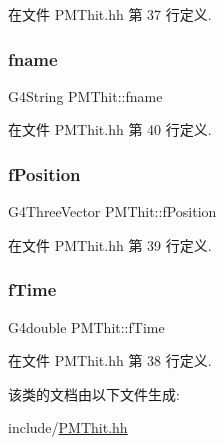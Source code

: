 在文件 P\+M\+Thit.\+hh 第 37 行定义.

\mbox{\label{classPMThit_a54a384bce361d05e46661879765acf6c}} 
\subsubsection{\texorpdfstring{fname}{fname}}
{\footnotesize\ttfamily G4\+String P\+M\+Thit\+::fname\hspace{0.3cm}{\ttfamily [private]}}



在文件 P\+M\+Thit.\+hh 第 40 行定义.

\mbox{\label{classPMThit_af2913329086e717fc91aa02748e1c646}} 
\subsubsection{\texorpdfstring{f\+Position}{fPosition}}
{\footnotesize\ttfamily G4\+Three\+Vector P\+M\+Thit\+::f\+Position\hspace{0.3cm}{\ttfamily [private]}}



在文件 P\+M\+Thit.\+hh 第 39 行定义.

\mbox{\label{classPMThit_aeab761e89a1b0cb09f48a6009a2eed92}} 
\subsubsection{\texorpdfstring{f\+Time}{fTime}}
{\footnotesize\ttfamily G4double P\+M\+Thit\+::f\+Time\hspace{0.3cm}{\ttfamily [private]}}



在文件 P\+M\+Thit.\+hh 第 38 行定义.



该类的文档由以下文件生成\+:\begin{DoxyCompactItemize}
\item 
include/\hyperlink{PMThit_8hh}{P\+M\+Thit.\+hh}\end{DoxyCompactItemize}

